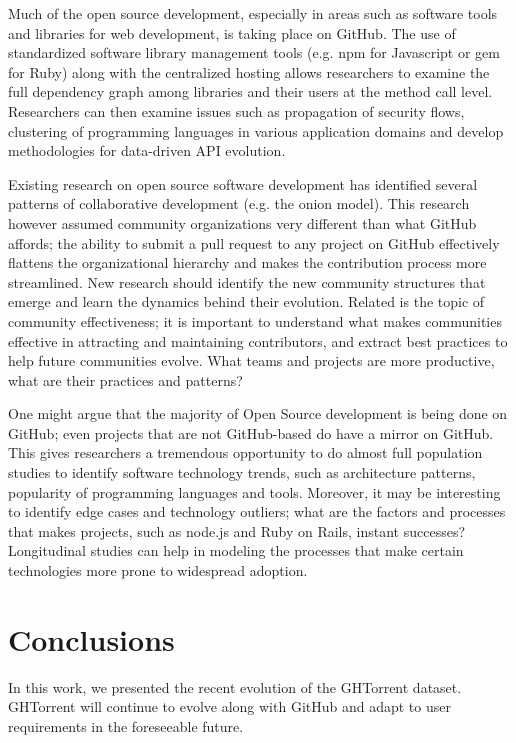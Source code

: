 \documentclass{sig-alternate}
\begin{document}
 Much of the open source development,
especially in areas such as software tools and libraries for web development, is
taking place on GitHub. The use of standardized software library management
tools (e.g. \textsf{npm} for Javascript or \textsf{gem} for Ruby) along with the
centralized hosting allows researchers to examine the full dependency graph
among libraries and their users at the method call level. Researchers can then
examine issues such as propagation of security flows, clustering of programming
languages in various application domains and develop methodologies for
data-driven API evolution.

 Existing research on open source
software development has identified several patterns of collaborative
development (e.g. the onion model). This research however assumed community
organizations very different than what GitHub affords; the ability to submit a
pull request to any project on GitHub effectively flattens the organizational
hierarchy and makes the contribution process more streamlined. New research
should identify the new community structures that emerge and learn the dynamics
behind their evolution. Related is the topic of community effectiveness;  it is
important to understand what makes communities effective in attracting and
maintaining contributors, and extract best practices to help future communities
evolve. What teams and projects are more productive, what are their practices
and patterns?

 One might argue that the majority of
Open Source development is being done on GitHub; even projects that are not
GitHub-based do have a mirror on GitHub. This gives researchers a tremendous
opportunity to do almost full population studies to identify software technology
trends, such as architecture patterns, popularity of programming languages and
tools.  Moreover, it may be interesting to identify edge cases and technology
outliers; what are the factors and processes that makes projects, such as
\textsf{node.js} and Ruby on Rails, instant successes? Longitudinal studies can
help in modeling the processes that make certain technologies more prone to
widespread adoption.

\section{Conclusions}

In this work, we presented the recent evolution of the GHTorrent dataset.
GHTorrent will continue to evolve along with GitHub and adapt to user
requirements in the foreseeable future.
\end{document}
